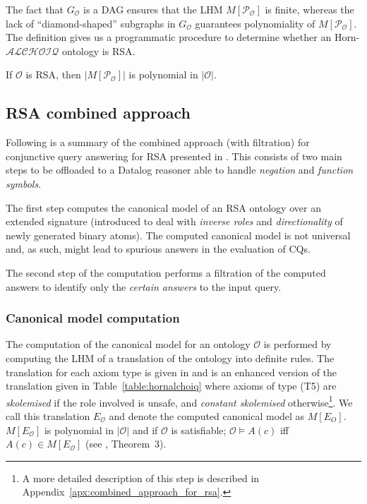 \documentclass[runningheads]{llncs}
\newcommand{\alchoiq}{$\mathcal{ALCHOIQ}$\xspace}
\newcommand{\hornalchoiq}{Horn-\alchoiq\xspace}
\newcommand{\datalog}{\mbox{Datalog}\xspace}
\begin{document}
The fact that $G_\mathcal{O}$ is a DAG ensures that the LHM $M[\mathcal{P}_\mathcal{O}]$ is finite, whereas the lack of ``diamond-shaped'' subgraphs in $G_\mathcal{O}$ guarantees polynomiality of $M[\mathcal{P}_\mathcal{O}]$.
The definition gives us a programmatic procedure to determine whether an \hornalchoiq ontology is RSA.

\begin{theorem}
    If $\mathcal{O}$ is RSA, then $|M[\mathcal{P}_\mathcal{O}]|$ is polynomial in $|\mathcal{O}|$.
\end{theorem}

\subsection{RSA combined approach}\label{ssec:rsa_combined_approach}

Following is a summary of the combined approach (with filtration) for conjunctive query answering for RSA presented in \cite{feier2015}.
This consists of two main steps to be offloaded to a \datalog reasoner able to handle \emph{negation} and \emph{function symbols}.

The first step computes the canonical model of an RSA ontology over an extended signature (introduced to deal with \emph{inverse roles} and \emph{directionality} of newly generated binary atoms).
The computed canonical model is not universal and, as such, might lead to spurious answers in the evaluation of CQs.

The second step of the computation performs a filtration of the computed answers to identify only the \emph{certain answers} to the input query.

\subsubsection{Canonical model computation}\label{sssec:canonical_model_computation}

The computation of the canonical model for an ontology $\mathcal{O}$ is performed by computing the LHM of a translation of the ontology into definite rules.
The translation for each axiom type is given in \cite{feier2015} and is an enhanced version of the translation given in Table~\ref{table:hornalchoiq} where axioms of type (T5) are \emph{skolemised} if the role involved is unsafe, and \emph{constant skolemised} otherwise\footnote{A more detailed description of this step is described in Appendix~\ref{apx:combined_approach_for_rsa}.}.
We call this translation $E_\mathcal{O}$ and denote the computed canonical model as $M[E_{O}]$.
$M[E_\mathcal{O}]$ is polynomial in $|\mathcal{O}|$ and if $\mathcal{O}$ is satisfiable; $\mathcal{O} \models A(c)$ iff $A(c) \in M[E_\mathcal{O}]$ (see \cite{feier2015}, Theorem~3).
\end{document}

